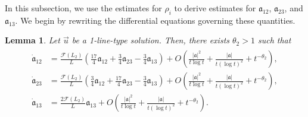 \documentclass[10pt,a4paper]{amsart}
\newtheorem{lemma}[theorem]{Lemma}
\numberwithin{equation}{section}
\begin{document}
In this subsection, we use the estimates for $\rho_i$ to derive estimates for $\mathfrak{a}_{12}$, $\mathfrak{a}_{23}$, and $\mathfrak{a}_{13}$. We begin by rewriting the differential equations governing these quantities.

\begin{lemma}\label{naisekiodekantan}
Let $\vec{u}$ be a 1-line-type solution. Then, there exists $\theta_2>1$ such that 
\begin{align}\label{kinenaisekiode2}
\begin{aligned}
\dot{\mathfrak{a}}_{12}&=\frac{\mathcal{F}(L_2)}{L}\left(\frac{17}{4}\mathfrak{a}_{12}+\frac{3}{4}\mathfrak{a}_{23}-\frac{3}{4}\mathfrak{a}_{13}\right)+O\left(\frac{|\mathfrak{a}|^2}{t\log{t}}+\frac{|\mathfrak{a}|}{t(\log{t})^2}+t^{-\theta_2}\right),
\\
\dot{\mathfrak{a}}_{23}&=\frac{\mathcal{F}(L_2)}{L}\left(\frac{3}{4}\mathfrak{a}_{12}+\frac{17}{4}\mathfrak{a}_{23}-\frac{3}{4}\mathfrak{a}_{13}\right)+O\left(\frac{|\mathfrak{a}|^2}{t\log{t}}+\frac{|\mathfrak{a}|}{t(\log{t})^2}+t^{-\theta_2}\right),
\\
\dot{\mathfrak{a}}_{13}&=\frac{2\mathcal{F}(L_2)}{L}\mathfrak{a}_{13}+O\left(\frac{|\mathfrak{a}|^2}{t\log{t}}+\frac{|\mathfrak{a}|}{t(\log{t})^2}+t^{-\theta_2}\right).
\end{aligned}
\end{align}
\end{lemma}
\end{document}
